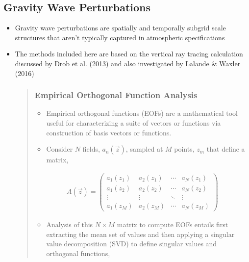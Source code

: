 \documentclass[letterpaper,10pt,english]{sphinxmanual}
\begin{document}
\subsection{Gravity Wave Perturbations}
\label{\detokenize{analysis:gravity}}\begin{itemize}
\item {} 
\sphinxAtStartPar
Gravity wave perturbations are spatially and temporally sub\sphinxhyphen{}grid scale structures that aren’t typically captured in atmospheric specifications

\item {} 
\sphinxAtStartPar
The methods included here are based on the vertical ray tracing calculation discussed by Drob et al. (2013) and also investigated by Lalande \& Waxler (2016)
\begin{quote}


\subsubsection{Empirical Orthogonal Function Analysis}
\label{\detokenize{eofs:empirical-orthogonal-function-analysis}}\label{\detokenize{eofs:eofs}}\label{\detokenize{eofs::doc}}\begin{itemize}
\item {} 
\sphinxAtStartPar
Empirical orthogonal functions (EOFs) are a mathematical tool useful for characterizing a suite of vectors or functions via construction of basis vectors or functions.

\item {} 
\sphinxAtStartPar
Consider \(N\) fields, \(a_n (\vec{z})\), sampled at \(M\) points, \(z_m\) that define a matrix,

\end{itemize}
\begin{equation*}
\begin{split}A \left( \vec{z} \right) =
\begin{pmatrix}
a_1 \left( z_1 \right) & a_2 \left( z_1 \right)     & \cdots        & a_N \left( z_1 \right) \\
a_1 \left( z_2 \right) & a_2 \left( z_2 \right)     & \cdots        & a_N \left( z_2 \right) \\
\vdots                              & \vdots                                        & \ddots        & \vdots         \\
a_1 \left( z_M \right) & a_2 \left( z_M \right)     & \cdots        & a_N \left( z_M \right)
\end{pmatrix}\end{split}
\end{equation*}\begin{itemize}
\item {} 
\sphinxAtStartPar
Analysis of this \(N \times M\) matrix to compute EOFs entails first extracting the mean set of values and then applying a singular value decomposition (SVD) to define singular values and orthogonal functions,


\end{itemize}
\end{quote}
\end{itemize}
\end{document}
